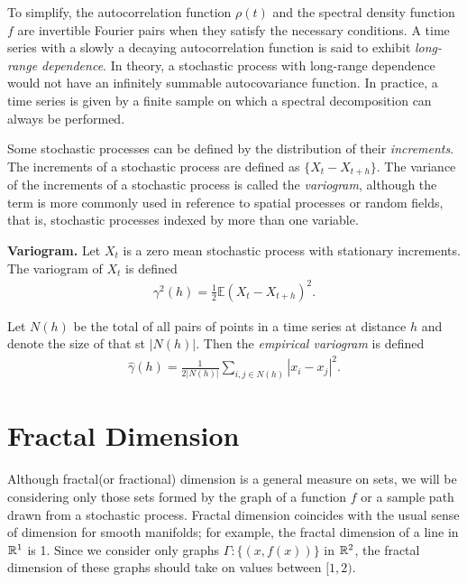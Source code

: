   To simplify, the autocorrelation function $\rho(t)$ 
  and the spectral density function $f$ are 
  invertible Fourier pairs when they satisfy the 
  necessary conditions. 
  A time series with a slowly a decaying autocorrelation function is said to exhibit \textit{long-range dependence}. In theory, a stochastic
  process with long-range dependence would not have an infinitely summable
  autocovariance function. In practice, a time series is given by a finite sample on which a spectral decomposition can always be performed.

Some stochastic processes can be defined by the distribution 
of their \textit{increments}. The increments of a stochastic process are defined as $\{ X_t - X_{t+h} \}$. The variance of the increments
of a stochastic process is called the \textit{variogram}, 
although the term is more commonly used in reference to 
spatial processes or random fields, that is, stochastic processes 
indexed by more than one variable. 
\begin{defn}{\textbf{Variogram.} }\label{def:variogram}
Let $X_t$ is a zero mean stochastic process with 
stationary increments. The variogram of $X_t$ 
is  defined
\begin{align*}
  \gamma^2(h) = \frac{1}{2}\mathbb{E}\left(X_t - X_{t + h} \right)^2.
\end{align*}
\end{defn}
Let $N(h)$ be the total of all pairs of points in 
a time series at distance
$h$ and denote the size of that st $|N(h)|$. Then the \textit{empirical variogram} is defined 
\begin{align*}
  \hat \gamma(h) =  \frac{1}{2|N(h)|}  \sum_{i,j\in N(h)} |x_i - x_j|^2.
\end{align*}

\section{Fractal Dimension}

Although fractal(or fractional) dimension is a general measure on sets,
we will be considering only those sets formed by the graph of a function $f$ or a sample path drawn from a stochastic process. Fractal dimension 
coincides with the usual sense of dimension for smooth manifolds; for example, the fractal dimension of a line in $\mathbb R^1$ is 1. 
Since we consider only graphs
 $\Gamma:\{ (x, f(x)) \}$ in $\mathbb R^2$,
the fractal dimension of these graphs should take on 
values between $[1,2)$.

